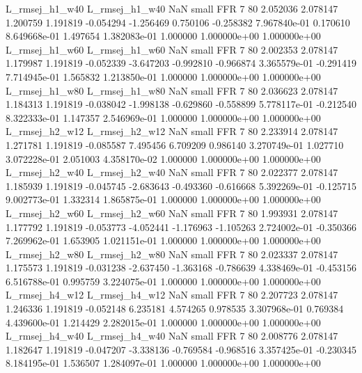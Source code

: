 L_rmsej_h1_w40 L_rmsej_h1_w40                   NaN      small      FFR                 7 80 2.052036       2.078147 1.200759       1.191819   -0.054294     -1.256469      0.750106    -0.258382   7.967840e-01  0.170610 8.649668e-01     1.497654   1.382083e-01            1.000000    1.000000e+00        1.000000e+00
L_rmsej_h1_w60 L_rmsej_h1_w60                   NaN      small      FFR                 7 80 2.002353       2.078147 1.179987       1.191819   -0.052339     -3.647203     -0.992810    -0.966874   3.365579e-01 -0.291419 7.714945e-01     1.565832   1.213850e-01            1.000000    1.000000e+00        1.000000e+00
L_rmsej_h1_w80 L_rmsej_h1_w80                   NaN      small      FFR                 7 80 2.036623       2.078147 1.184313       1.191819   -0.038042     -1.998138     -0.629860    -0.558899   5.778117e-01 -0.212540 8.322333e-01     1.147357   2.546969e-01            1.000000    1.000000e+00        1.000000e+00
L_rmsej_h2_w12 L_rmsej_h2_w12                   NaN      small      FFR                 7 80 2.233914       2.078147 1.271781       1.191819   -0.085587      7.495456      6.709209     0.986140   3.270749e-01  1.027710 3.072228e-01     2.051003   4.358170e-02            1.000000    1.000000e+00        1.000000e+00
L_rmsej_h2_w40 L_rmsej_h2_w40                   NaN      small      FFR                 7 80 2.022377       2.078147 1.185939       1.191819   -0.045745     -2.683643     -0.493360    -0.616668   5.392269e-01 -0.125715 9.002773e-01     1.332314   1.865875e-01            1.000000    1.000000e+00        1.000000e+00
L_rmsej_h2_w60 L_rmsej_h2_w60                   NaN      small      FFR                 7 80 1.993931       2.078147 1.177792       1.191819   -0.053773     -4.052441     -1.176963    -1.105263   2.724002e-01 -0.350366 7.269962e-01     1.653905   1.021151e-01            1.000000    1.000000e+00        1.000000e+00
L_rmsej_h2_w80 L_rmsej_h2_w80                   NaN      small      FFR                 7 80 2.023337       2.078147 1.175573       1.191819   -0.031238     -2.637450     -1.363168    -0.786639   4.338469e-01 -0.453156 6.516788e-01     0.995759   3.224075e-01            1.000000    1.000000e+00        1.000000e+00
L_rmsej_h4_w12 L_rmsej_h4_w12                   NaN      small      FFR                 7 80 2.207723       2.078147 1.246336       1.191819   -0.052148      6.235181      4.574265     0.978535   3.307968e-01  0.769384 4.439600e-01     1.214429   2.282015e-01            1.000000    1.000000e+00        1.000000e+00
L_rmsej_h4_w40 L_rmsej_h4_w40                   NaN      small      FFR                 7 80 2.008776       2.078147 1.182647       1.191819   -0.047207     -3.338136     -0.769584    -0.968516   3.357425e-01 -0.230345 8.184195e-01     1.536507   1.284097e-01            1.000000    1.000000e+00        1.000000e+00
